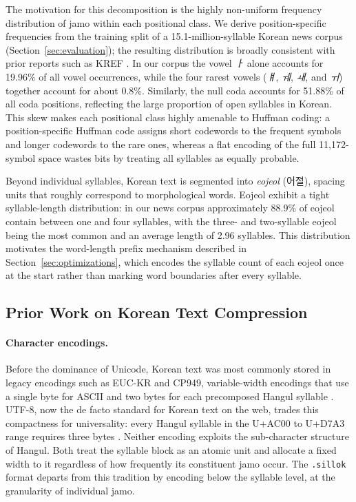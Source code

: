 \documentclass[conference]{IEEEtran}
\begin{document}
The motivation for this decomposition is the highly non-uniform frequency
distribution of jamo within each positional class. We derive position-specific
frequencies from the training split of a 15.1-million-syllable Korean news
corpus (Section~\ref{sec:evaluation}); the resulting distribution is broadly
consistent with prior reports such as KREF \cite{kref}. In our corpus the
vowel \emph{ㅏ} alone accounts for 19.96\% of all vowel occurrences, while the
four rarest vowels (\emph{ㅒ}, \emph{ㅞ}, \emph{ㅙ}, and \emph{ㅟ}) together
account for about 0.8\%. Similarly, the null coda accounts for 51.88\% of all
coda positions, reflecting the large proportion of open syllables in Korean.
This skew makes each positional class highly amenable to Huffman coding: a
position-specific Huffman code assigns short codewords to the frequent symbols
and longer codewords to the rare ones, whereas a flat encoding of the full
11,172-symbol space wastes bits by treating all syllables as equally probable.

Beyond individual syllables, Korean text is segmented into \emph{eojeol}
(어절), spacing units that roughly correspond to morphological words.
Eojeol exhibit a tight syllable-length distribution: in our news corpus
approximately 88.9\% of eojeol contain between one and four syllables, with
the three- and two-syllable eojeol being the most common and an average
length of 2.96 syllables. This distribution motivates the word-length prefix
mechanism described in Section~\ref{sec:optimizations}, which encodes the
syllable count of each eojeol once at the start rather than marking word
boundaries after every syllable.

\subsection{Prior Work on Korean Text Compression}

\paragraph{Character encodings.} Before the dominance of Unicode, Korean text
was most commonly stored in legacy encodings such as EUC-KR and CP949,
variable-width encodings that use a single byte for ASCII and two bytes for
each precomposed Hangul syllable \cite{rfc1557}. UTF-8, now the
de facto standard for Korean text on the web, trades this compactness for
universality: every Hangul syllable in the U+AC00 to U+D7A3 range requires
three bytes \cite{rfc3629, unicodehangul}. Neither encoding exploits the
sub-character structure of Hangul. Both treat the syllable block as an atomic
unit and allocate a fixed width to it regardless of how frequently its
constituent jamo occur. The \texttt{.sillok} format departs from this
tradition by encoding below the syllable level, at the granularity of
individual jamo.
\end{document}
